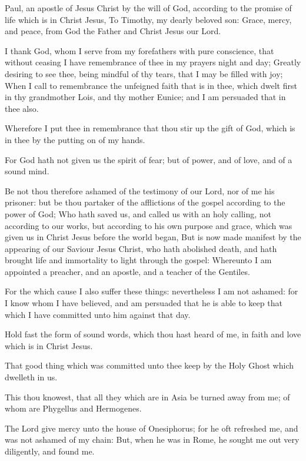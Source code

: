 \Chapter
\Verse Paul, an apostle of Jesus Christ by the will of God, according to the promise of life which is in Christ Jesus, \Verse To Timothy, my dearly beloved son: Grace, mercy, and peace, from God the Father and Christ Jesus our Lord.

\Verse I thank God, whom I serve from my forefathers with pure conscience, that without ceasing I have remembrance of thee in my prayers night and day; \Verse Greatly desiring to see thee, being mindful of thy tears, that I may be filled with joy; \Verse When I call to remembrance the unfeigned faith that is in thee, which dwelt first in thy grandmother Lois, and thy mother Eunice; and I am persuaded that in thee also.

\Verse Wherefore I put thee in remembrance that thou stir up the gift of God, which is in thee by the putting on of my hands.

\Verse For God hath not given us the spirit of fear; but of power, and of love, and of a sound mind.

\Verse Be not thou therefore ashamed of the testimony of our Lord, nor of me his prisoner: but be thou partaker of the afflictions of the gospel according to the power of God; \Verse Who hath saved us, and called us with an holy calling, not according to our works, but according to his own purpose and grace, which was given us in Christ Jesus before the world began, \Verse But is now made manifest by the appearing of our Saviour Jesus Christ, who hath abolished death, and hath brought life and immortality to light through the gospel: \Verse Whereunto I am appointed a preacher, and an apostle, and a teacher of the Gentiles.

\Verse For the which cause I also suffer these things: nevertheless I am not ashamed: for I know whom I have believed, and am persuaded that he is able to keep that which I have committed unto him against that day.

\Verse Hold fast the form of sound words, which thou hast heard of me, in faith and love which is in Christ Jesus.

\Verse That good thing which was committed unto thee keep by the Holy Ghost which dwelleth in us.

\Verse This thou knowest, that all they which are in Asia be turned away from me; of whom are Phygellus and Hermogenes.

\Verse The Lord give mercy unto the house of Onesiphorus; for he oft refreshed me, and was not ashamed of my chain: \Verse But, when he was in Rome, he sought me out very diligently, and found me.

